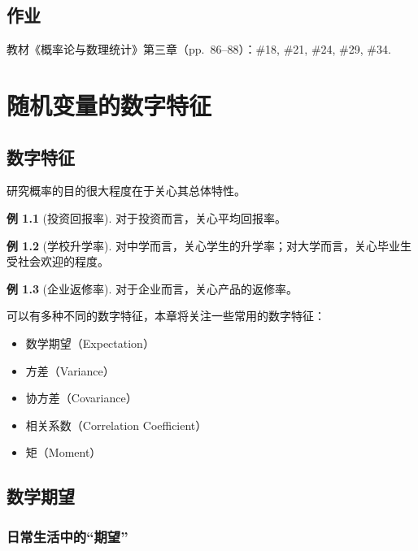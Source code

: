 \documentclass[11pt,a4paper]{report}
\theoremstyle{definition}
\newtheorem{example}{例}[chapter]
\begin{document}
\section*{作业}


教材《概率论与数理统计》第三章（pp.~86--88）：\#18, \#21, \#24, \#29, \#34.

\newpage
\chapter{随机变量的数字特征}

\section{数字特征}

研究概率的目的很大程度在于关心其总体特性。

\begin{example}[投资回报率]
对于投资而言，关心平均回报率。
\end{example}

\begin{example}[学校升学率]
对中学而言，关心学生的升学率；对大学而言，关心毕业生受社会欢迎的程度。
\end{example}

\begin{example}[企业返修率]
对于企业而言，关心产品的返修率。
\end{example}

可以有多种不同的数字特征，本章将关注一些常用的数字特征：
\begin{itemize}[leftmargin=2em]
    \item 数学期望（Expectation）
    \item 方差（Variance）
    \item 协方差（Covariance）
    \item 相关系数（Correlation Coefficient）
    \item 矩（Moment）
\end{itemize}

\section{数学期望}

\subsection{日常生活中的``期望''}
\end{document}
